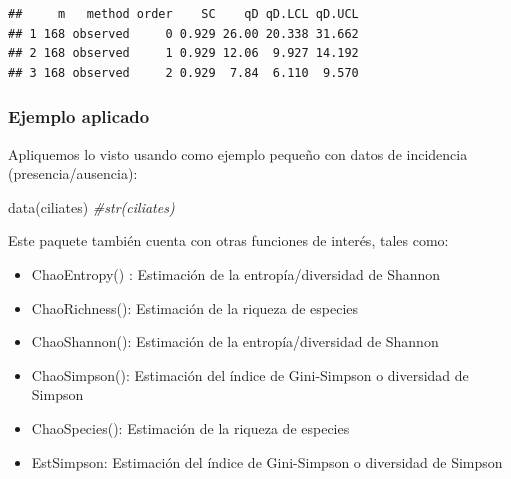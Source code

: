 \documentclass[
]{article}
\newenvironment{Shaded}{\begin{snugshade}}{\end{snugshade}}
\newcommand{\AttributeTok}[1]{\textcolor[rgb]{0.77,0.63,0.00}{#1}}
\newcommand{\CommentTok}[1]{\textcolor[rgb]{0.56,0.35,0.01}{\textit{#1}}}
\newcommand{\FloatTok}[1]{\textcolor[rgb]{0.00,0.00,0.81}{#1}}
\newcommand{\FunctionTok}[1]{\textcolor[rgb]{0.00,0.00,0.00}{#1}}
\newcommand{\NormalTok}[1]{#1}
\newcommand{\SpecialCharTok}[1]{\textcolor[rgb]{0.00,0.00,0.00}{#1}}
\newcommand{\StringTok}[1]{\textcolor[rgb]{0.31,0.60,0.02}{#1}}
\begin{document}
\begin{Shaded}
\end{Shaded}

\begin{verbatim}
##     m   method order    SC    qD qD.LCL qD.UCL
## 1 168 observed     0 0.929 26.00 20.338 31.662
## 2 168 observed     1 0.929 12.06  9.927 14.192
## 3 168 observed     2 0.929  7.84  6.110  9.570
\end{verbatim}

\hfill\break

\hypertarget{ejemplo-aplicado-2}{%
\subsubsection{Ejemplo aplicado}\label{ejemplo-aplicado-2}}

Apliquemos lo visto usando como ejemplo pequeño con datos de incidencia
(presencia/ausencia):

\begin{Shaded}
\begin{Highlighting}[]
\FunctionTok{data}\NormalTok{(ciliates)}
\CommentTok{\#str(ciliates)}
\end{Highlighting}
\end{Shaded}

\hfill\break

Este paquete también cuenta con otras funciones de interés, tales como:

\begin{itemize}
\item
  ChaoEntropy() : Estimación de la entropía/diversidad de Shannon
\item
  ChaoRichness(): Estimación de la riqueza de especies
\item
  ChaoShannon(): Estimación de la entropía/diversidad de Shannon
\item
  ChaoSimpson(): Estimación del índice de Gini-Simpson o diversidad de
  Simpson
\item
  ChaoSpecies(): Estimación de la riqueza de especies
\item
  EstSimpson: Estimación del índice de Gini-Simpson o diversidad de
  Simpson
\end{itemize}
\end{document}
